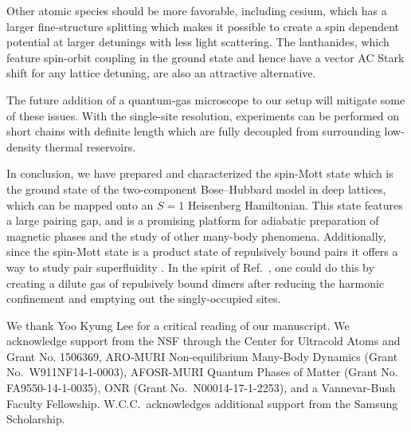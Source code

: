 \documentclass[aps,prl,twocolumn]{revtex4-1}
\begin{document}
Other atomic species should be more favorable, including cesium, which has a larger fine-structure splitting which makes it possible to create a spin dependent potential at larger detunings with less light scattering. The lanthanides, which feature spin-orbit coupling in the ground state and hence have a vector AC Stark shift for any lattice detuning, are also an attractive alternative.

The future addition of a quantum-gas microscope to our setup \cite{Bakr09} will mitigate some of these issues. With the single-site resolution, experiments can be performed on short chains with definite length which are fully decoupled from surrounding low-density thermal reservoirs.

In conclusion, we have prepared and characterized the spin-Mott state which is the ground state of the two-component Bose--Hubbard model in deep lattices, which can be mapped onto an $S = 1$ Heisenberg Hamiltonian. This state features a large pairing gap, and is a promising platform for adiabatic preparation of magnetic phases and the study of other many-body phenomena. Additionally, since the spin-Mott state is a product state of repulsively bound pairs it offers a way to study pair superfluidity \cite{Menotti10, Daley09}. In the spirit of Ref.~\cite{Volz06}, one could do this by creating a dilute gas of repulsively bound dimers after reducing the harmonic confinement and emptying out the singly-occupied sites.

\begin{acknowledgments}
We thank Yoo Kyung Lee for a critical reading of our manuscript.
We acknowledge support from the NSF through the Center for Ultracold Atoms and Grant No. 1506369, ARO-MURI Non-equilibrium Many-Body Dynamics (Grant No.\ W911NF14-1-0003), AFOSR-MURI Quantum Phases of Matter (Grant No. FA9550-14-1-0035), ONR (Grant No.\ N00014-17-1-2253), and a Vannevar-Bush Faculty Fellowship. W.C.C.\ acknowledges additional support from the Samsung Scholarship. 
\end{acknowledgments}




\end{document}
